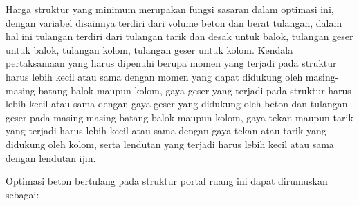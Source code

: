 Harga struktur yang minimum merupakan fungsi sasaran dalam optimasi ini,
dengan variabel disainnya terdiri dari volume beton dan berat tulangan,
dalam hal ini tulangan terdiri dari tulangan tarik dan desak untuk balok,
tulangan geser untuk balok, tulangan kolom, tulangan geser untuk kolom.
Kendala pertaksamaan yang harus dipenuhi berupa momen yang terjadi pada
struktur harus lebih kecil atau sama dengan momen yang dapat didukung oleh
masing-masing batang balok maupun kolom, gaya geser yang terjadi pada
struktur harus lebih kecil atau sama dengan gaya geser yang didukung oleh
beton dan tulangan geser pada masing-masing batang balok maupun kolom, gaya
tekan maupun tarik yang terjadi harus lebih kecil atau sama dengan gaya
tekan atau tarik yang didukung oleh kolom, serta lendutan yang terjadi harus
lebih kecil atau sama dengan lendutan ijin.

Optimasi beton bertulang pada struktur portal ruang ini dapat dirumuskan
sebagai:

